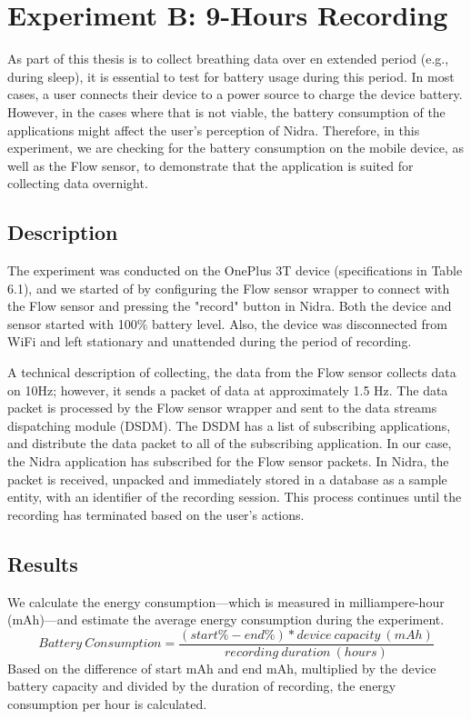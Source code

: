 \section{Experiment B: 9-Hours Recording}
As part of this thesis is to collect breathing data over en extended period (e.g., during sleep), it is essential to test for battery usage during this period. In most cases, a user connects their device to a power source to charge the device battery. However, in the cases where that is not viable, the battery consumption of the applications might affect the user's perception of Nidra. Therefore, in this experiment, we are checking for the battery consumption on the mobile device, as well as the Flow sensor, to demonstrate that the application is suited for collecting data overnight.

\subsection{Description}
The experiment was conducted on the OnePlus 3T device (specifications in Table 6.1), and we started of by configuring the Flow sensor wrapper to connect with the Flow sensor and pressing the "record" button in Nidra. Both the device and sensor started with 100\% battery level. Also, the device was disconnected from WiFi and left stationary and unattended during the period of recording.  

A technical description of collecting, the data from the Flow sensor collects data on 10Hz; however, it sends a packet of data at approximately 1.5 Hz. The data packet is processed by the Flow sensor wrapper and sent to the data streams dispatching module (DSDM). The DSDM has a list of subscribing applications, and distribute the data packet to all of the subscribing application. In our case, the Nidra application has subscribed for the Flow sensor packets. In Nidra, the packet is received, unpacked and immediately stored in a database as a sample entity, with an identifier of the recording session. This process continues until the recording has terminated based on the user's actions.

\subsection{Results}

We calculate the energy consumption---which is measured in milliampere-hour (mAh)---and estimate the average energy consumption during the experiment. 
\begin{equation} \label{losscount}
Battery\ Consumption = \frac{(start\% - end\%) * device\ capacity\ (mAh)}{recording\ duration\ (hours)}
\end{equation}
Based on the difference of start mAh and end mAh, multiplied by the device battery capacity and divided by the duration of recording, the energy consumption per hour is calculated. 

